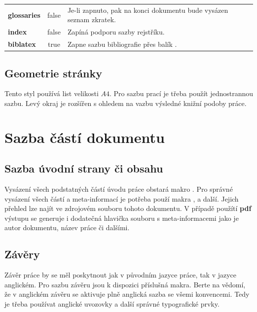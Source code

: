 \documentclass[
  biblatex,
  glossaries,
  index
]{kidiplom}
\begin{document}
\begin{table}
\begin{center}
{\begin{tabular}{>{\bfseries}l >{\ttfamily}c L{8cm}}
        glossaries             & false                         & Je-li zapnuto, pak na konci dokumentu bude vysázen seznam zkratek.                                                   \\

        index                  & false                         & Zapíná podporu sazby rejstříku.                                                                                      \\

        biblatex               & true                          & Zapne sazbu bibliografie přes balík \BibLaTeX{}.
      \end{tabular}}
  \end{center}
\end{table}

\subsection{Geometrie stránky}
Tento styl používá list velikosti $A4$. Pro sazbu prací je třeba použít jednostrannou sazbu. Levý okraj je rozšířen s ohledem na vazbu výsledné knižní podoby práce.









\section{Sazba částí dokumentu}
\subsection{Sazba úvodní strany či obsahu}
Vysázení všech podstatných částí úvodu práce obstará makro . Pro správné vysázení všech částí a meta-informací je potřeba použí makra ,  a další. Jejich přehled lze najít ve zdrojovém souboru tohoto dokumentu. V případě použítí \textbf{pdf} výstupu se generuje i dodatečná hlavička souboru s meta-informacemi jako je autor dokumentu, název práce či dalšími.

\subsection{Závěry}
Závěr práce by se měl poskytnout jak v původním jazyce práce, tak v jazyce anglickém. Pro sazbu závěru jsou k dispozici příslušná makra. Berte na vědomí, že v anglickém závěru se aktivuje plně anglická sazba se všemi konvencemi. Tedy je třeba používat anglické uvozovky a další správné typografické prvky.
\end{document}
